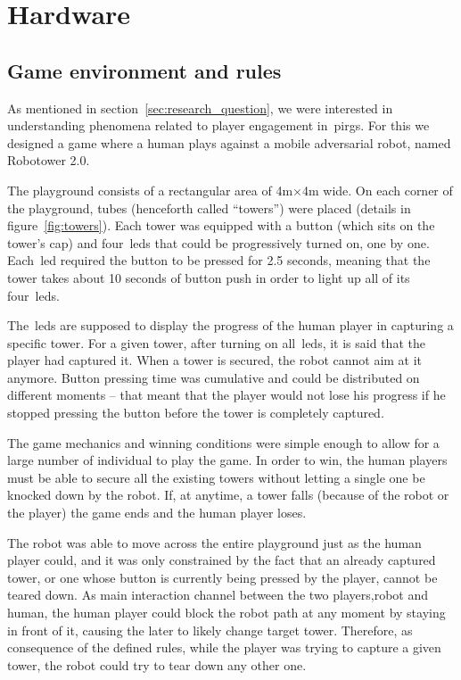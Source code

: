 \chapter{Hardware}\label{ch:foundation}
\section{Game environment and rules}\label{sec:game_environment}
As mentioned in section~\ref{sec:research_question}, we were interested in understanding phenomena related to player engagement in~\glspl{pirg}. For this we designed a game where a human plays against a mobile adversarial robot, named Robotower 2.0.

The playground consists of a rectangular area of 4m$\times$4m wide. On each corner of the playground, tubes (henceforth called ``towers'') were placed (details in figure~\ref{fig:towers}). Each tower was equipped with a button (which sits on the tower's cap) and four~\glspl{led} that could be progressively turned on, one by one.  Each~\gls{led} required the button to be pressed for 2.5 seconds, meaning that the tower takes about 10 seconds of button push in order to light up all of its four~\glspl{led}.

The~\glspl{led} are supposed to display the progress of the human player in capturing a specific tower. For a given tower, after turning on all~\glspl{led}, it is said that the player had captured it. When a tower is secured, the robot cannot aim at it anymore.
Button pressing time was cumulative and could be distributed on different moments -- that meant that the player would not lose his progress if he stopped pressing the button before the tower is completely captured. 

The game mechanics and winning conditions were simple enough to allow for a large number of individual to play the game. In order to win, the human players must be able to secure all the existing towers without letting a single one be knocked down by the robot. If, at anytime, a tower falls (because of the robot or the player) the game ends and the human player loses. 

The robot was able to move across the entire playground just as the human player could, and it was only constrained by the fact that an already captured tower, or one whose button is currently being pressed by the player, cannot be teared down. As main interaction channel between the two players,\ie robot and human, the human player could block the robot path at any moment by staying in front of it, causing the later to likely change target tower. Therefore, as consequence of the defined rules, while the player was trying to capture a given tower, the robot could try to tear down any other one.

